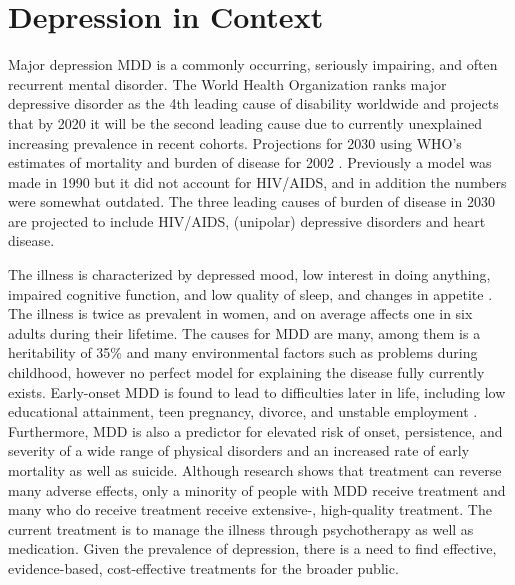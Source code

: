 \section{Depression in Context}
Major depression MDD \cite{major-depressive-disorder} is a commonly occurring, seriously impairing, and often recurrent mental disorder. The World Health Organization ranks major depressive disorder as the 4th leading cause of disability worldwide \cite{murray1996} and projects that by 2020 it will be the second leading cause due to currently unexplained increasing prevalence in recent cohorts. Projections for 2030 using WHO’s estimates of mortality and  burden of disease for 2002 \cite{projections_of_burden_of_disease}. Previously a model was made in 1990 but it did not account for HIV/AIDS, and in addition the numbers were somewhat outdated. The  three leading causes of burden of disease in 2030 are projected to include HIV/AIDS, (unipolar) depressive disorders and heart disease. 

The illness is characterized by depressed mood, low interest in doing anything, impaired cognitive function, and low quality of sleep, and changes in appetite \cite{mdd}. The illness is twice as prevalent in women, and on average affects one in six adults during their lifetime. The causes for MDD are many, among them is a heritability of 35\% and many environmental factors such as problems during childhood, however no perfect model for explaining the disease fully currently exists. Early-onset MDD is found to lead to difficulties later in life, including low educational attainment, teen pregnancy, divorce, and unstable employment \cite{costs_of_depression}. Furthermore, MDD is also a predictor for elevated risk of onset, persistence, and severity of a wide range of physical disorders and an increased rate of early mortality as well as suicide. Although research shows that treatment can reverse many adverse effects, only a minority of people with MDD receive treatment and many who do receive treatment receive extensive-, high-quality treatment. The current treatment is to manage the illness through psychotherapy as well as medication. Given the prevalence of depression, there is a need to find effective, evidence-based, cost-effective treatments for the broader public. 

